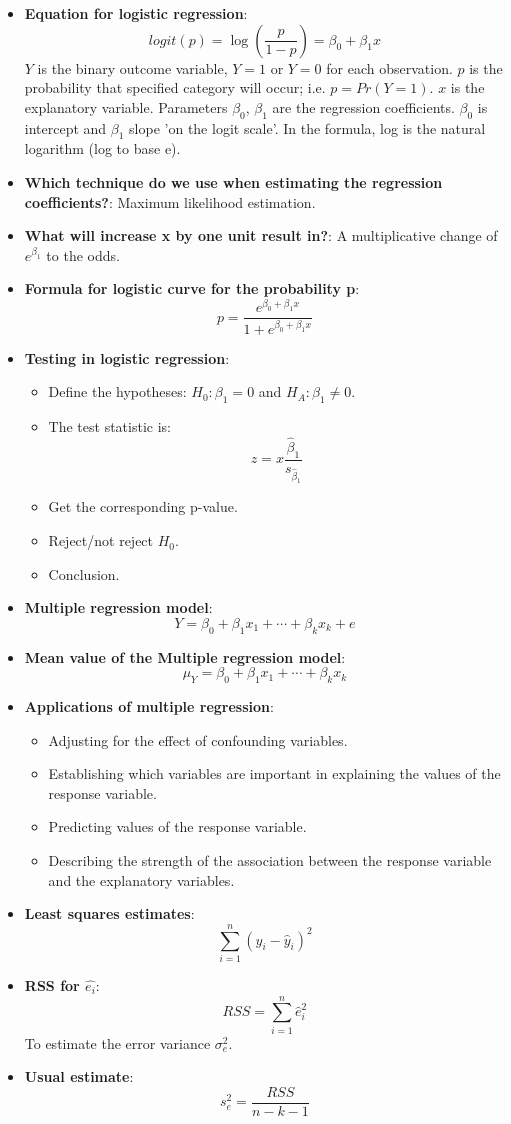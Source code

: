 \documentclass[12pt]{article}
\begin{document}
\begin{itemize}
\begin{figure}[H]
\end{figure}
\item \textbf{Equation for logistic regression}: 
$$logit(p) = \log\left(\frac{p}{1-p}\right) = \beta_0 + \beta_1x$$
$Y$ is the binary outcome variable, $Y = 1$ or $Y = 0$ for each observation. $p$ is the probability that specified category will occur; i.e. $p = Pr(Y = 1)$. $x$ is the explanatory variable. Parameters $\beta_0$, $\beta_1$ are the regression coefficients. $\beta_0$ is intercept and $\beta_1$ slope 'on the logit scale'. In the formula, log is the natural logarithm (log to base e).
\item \textbf{Which technique do we use when estimating the regression coefficients?}: Maximum likelihood estimation.
\item \textbf{What will increase x by one unit result in?}: A multiplicative change of $e^{\beta_1}$ to the odds.
\item \textbf{Formula for logistic curve for the probability p}: 
$$p = \frac{e^{\beta_0 + \beta_1x}}{1+e^{\beta_0 + \beta_1x}}$$
\item \textbf{Testing in logistic regression}:
\begin{itemize}
\item Define the hypotheses: $H_0 : \beta_1 = 0$ and $H_A : \beta_1 \neq 0$.
\item The test statistic is: 
$$z = x\frac{\hat{\beta}_1}{s_{\hat{\beta}_1}}$$
\item Get the corresponding p-value.
\item Reject/not reject $H_0$.
\item Conclusion.
\end{itemize}
\item \textbf{Multiple regression model}:
$$Y = \beta_0 + \beta_1x_1 + \cdots + \beta_kx_k + e$$
\item \textbf{Mean value of the Multiple regression model}: 
$$\mu_Y = \beta_0 + \beta_1x_{1} + \cdots + \beta_kx_{k}$$
\item \textbf{Applications of multiple regression}:
\begin{itemize}
\item Adjusting for the effect of confounding variables.
\item Establishing which variables are important in explaining the values of the response variable.
\item Predicting values of the response variable.
\item Describing the strength of the association between the response variable and the explanatory variables.
\end{itemize}
\item \textbf{Least squares estimates}: 
$$\sum_{i=1}^{n} (y_i - \hat{y}_i)^2$$
\item \textbf{RSS for $\hat{e_i}$}: 
$$RSS = \sum_{i=1}^{n} \hat{e}_i^2$$
To estimate the error variance $\sigma^2_e$.
\item \textbf{Usual estimate}: 
$$s_e^2 = \frac{RSS}{n - k - 1}$$
\end{itemize}
\end{document}
